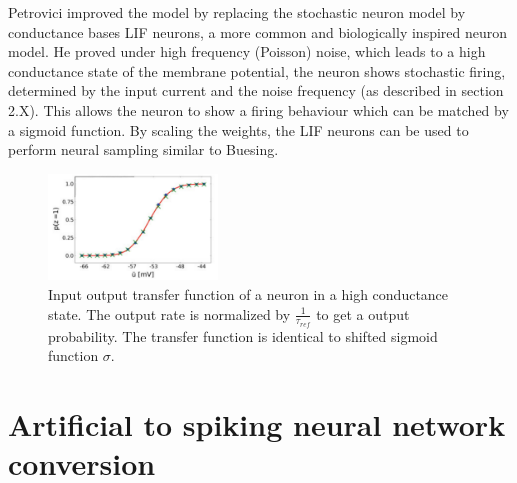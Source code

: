 Petrovici improved the model by replacing the stochastic neuron model by conductance bases LIF neurons, a more common and biologically inspired neuron model.
He proved under high frequency (Poisson) noise, which leads to a high conductance state of the membrane potential, the neuron shows stochastic firing, determined by the input current and the noise frequency (as described in section 2.X).
This allows the neuron to show a firing behaviour which can be matched by a sigmoid function.  
By scaling the weights, the LIF neurons can be used to perform neural sampling similar to Buesing.

\begin{figure}
	\centering
    	\includegraphics[width=0.4\textwidth]{imgs/snn_sample5.png} 
    \caption{Input output transfer function of a neuron in a high conductance state. The output rate is normalized by $\frac{1}{\tau_{ref}}$ to get a output probability. The transfer function is identical to shifted sigmoid function $\sigma$.}
	\label{fig:snnsmap4}
\end{figure}

\section{Artificial to spiking neural network conversion}

